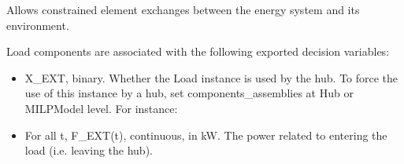 \documentclass[letterpaper,10pt,english]{sphinxmanual}
\begin{document}
\begin{fulllineitems}
\label{\detokenize{generated/tamos.elementIO.Load:tamos.elementIO.Load}}
\pysigstartsignatures
{}
\pysigstopsignatures{}

\begin{fulllineitems}
\label{\detokenize{generated/tamos.elementIO.Load:tamos.elementIO.Load.__init__}}
\pysigstartsignatures
{}
\pysigstopsignatures
\sphinxAtStartPar
Allows constrained element exchanges between the energy system and its environment.

\sphinxAtStartPar
Load components are associated with the following exported decision variables:
\begin{itemize}
\item {} 
\sphinxAtStartPar
X\_EXT, binary.
Whether the Load instance is used by the hub.
To force the use of this instance by a hub, set components\_assemblies at Hub or MILPModel level.
For instance:

\begin{sphinxVerbatim}[commandchars=\\\{\}]
  \PYG{p}{[}  \PYG{p}{]}
\end{sphinxVerbatim}

\item {} 
\sphinxAtStartPar
For all t, F\_EXT(t), continuous, in kW.
The power related to  entering the load (i.e. leaving the hub).


\end{itemize}
\end{fulllineitems}
\end{fulllineitems}
\end{document}
